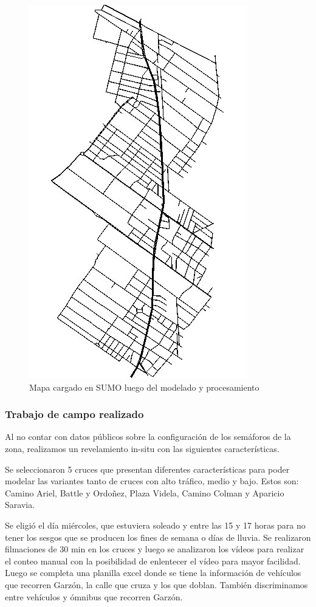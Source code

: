 \begin{figure}[H]
\centering
\includegraphics[width=0.5\linewidth]{Figures/mapa_sumo}
\caption{Mapa cargado en SUMO luego del modelado y procesamiento}
\label{fig:mapa_sumo}
\end{figure}



\subsubsection{Trabajo de campo realizado}
Al no contar con datos públicos sobre la configuración de los semáforos de la zona, realizamos un revelamiento in-situ con las siguientes características.

Se seleccionaron 5 cruces que presentan diferentes características para poder modelar las variantes tanto de cruces con alto tráfico, medio y bajo. 
Estos son: Camino Ariel, Battle y Ordoñez, Plaza Videla, Camino Colman y Aparicio Saravia.

Se eligió el día miércoles, que estuviera soleado y entre las 15 y 17 horas para no tener los sesgos que se producen los fines de semana o días de lluvia.
Se realizaron filmaciones de 30 min en los cruces y luego se analizaron los vídeos para realizar el conteo manual con la posibilidad de enlentecer el vídeo para mayor facilidad. Luego se completa una planilla excel donde se tiene la información de vehículos que recorren Garzón, la calle que cruza y los que doblan. También discriminamos entre vehículos y ómnibus que recorren Garzón.

